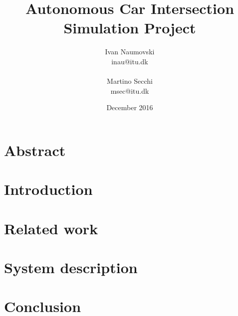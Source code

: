 \documentclass{article}
\begin{document}
\title{Autonomous Car Intersection Simulation Project}

\author{
   Ivan Naumovski\\
    {inau@itu.dk}\\
    \\
   Martino Secchi\\
    {msec@itu.dk}\\
}
\date{December 2016}

\maketitle
\clearpage
\tableofcontents
\clearpage


\section{Abstract}


\section{Introduction}


\section{Related work}


\section{System description}


\section{Conclusion}



\end{document}
